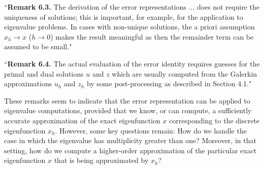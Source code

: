 \documentclass[12pt,a4paper]{article}
\theoremstyle{boldthm}
\theoremstyle{bolddefn}
\begin{document}
``\textbf{Remark 6.3.}
The derivation of the error representations $\dots$ does not require the uniqueness of solutions; this is important, for example, for the application to eigenvalue problems. In cases with non-unique solutions, the a priori assumption $x_h \to x$ ($h \to 0$) makes the result meaningful as then the remainder term can be assumed to be small."

``\textbf{Remark 6.4.}
The actual evaluation of the error identity requires guesses for the primal and dual solutions $u$ and $z$ which are usually computed from the Galerkin approximations $u_h$ and $z_h$ by some post-processing as described in Section 4.1."


These remarks seem to indicate that the error representation can be applied to eigenvalue computations, provided that we know, or can compute, a sufficiently accurate approximation of the exact eigenfunction $x$ corresponding to the discrete eigenfunction $x_h$. However, some key questions remain: How do we handle the case in which the eigenvalue has multiplicity greater than one? Moreover, in that setting, how do we compute a higher-order approximation of the particular exact eigenfunction $x$ that is being approximated by $x_h$?
\end{document}
